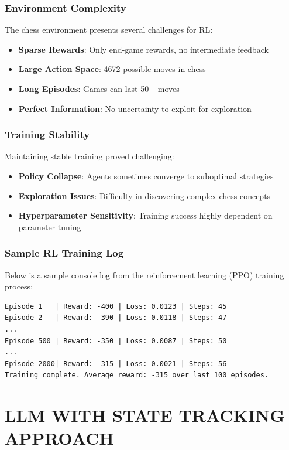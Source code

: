 \documentclass[11pt,a4paper]{report}
\begin{document}
\subsection{Environment Complexity}
The chess environment presents several challenges for RL:

\begin{itemize}
    \item \textbf{Sparse Rewards}: Only end-game rewards, no intermediate feedback
    \item \textbf{Large Action Space}: 4672 possible moves in chess
    \item \textbf{Long Episodes}: Games can last 50+ moves
    \item \textbf{Perfect Information}: No uncertainty to exploit for exploration
\end{itemize}

\subsection{Training Stability}
Maintaining stable training proved challenging:

\begin{itemize}
    \item \textbf{Policy Collapse}: Agents sometimes converge to suboptimal strategies
    \item \textbf{Exploration Issues}: Difficulty in discovering complex chess concepts
    \item \textbf{Hyperparameter Sensitivity}: Training success highly dependent on parameter tuning
\end{itemize}

\subsection{Sample RL Training Log}
Below is a sample console log from the reinforcement learning (PPO) training process:

\begin{lstlisting}[style=Python]
Episode 1   | Reward: -400 | Loss: 0.0123 | Steps: 45
Episode 2   | Reward: -390 | Loss: 0.0118 | Steps: 47
...
Episode 500 | Reward: -350 | Loss: 0.0087 | Steps: 50
...
Episode 2000| Reward: -315 | Loss: 0.0021 | Steps: 56
Training complete. Average reward: -315 over last 100 episodes.
\end{lstlisting}

\chapter{LLM WITH STATE TRACKING APPROACH}
\thispagestyle{fancy}
\end{document}
